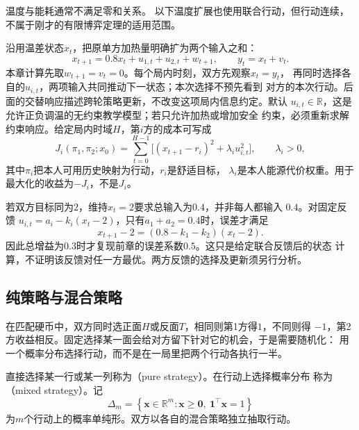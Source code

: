 温度与能耗通常不满足零和关系。
以下温度扩展也使用联合行动，但行动连续，不属于刚才的有限博弈定理的适用范围。

\begin{example}[两方共同加热的状态与成本]
\label{ex:game-two-heaters}
沿用温差状态\(x_t\)，把原单方加热量明确扩为两个输入之和：
\begin{equation}
  x_{t+1}=0.8x_t+u_{1,t}+u_{2,t}+w_{t+1},
  \qquad y_t=x_t+v_t.
  \label{eq:game-two-heater-dynamics}
\end{equation}
本章计算先取\(w_{t+1}=v_t=0\)。每个局内时刻，双方先观察\(x_t=y_t\)，
再同时选择各自的\(u_{i,t}\)，两项输入共同推动下一状态；本次选择不预先看到
对方的本次行动。后面的交替响应描述跨轮策略更新，不改变这项局内信息约定。默认
\(u_{i,t}\in\mathbb R\)，这是允许正负调温的无约束教学模型；若只允许加热或增加安全
约束，必须重新求解约束响应。给定局内时域\(H\)，第\(i\)方的成本可写成
\[
  J_i(\pi_1,\pi_2;x_0)
  =\sum_{t=0}^{H-1}
  \bigl[(x_{t+1}-r_i)^2+\lambda_i u_{i,t}^2\bigr],
  \qquad \lambda_i>0,
\]
其中\(\pi_i\)把本人可用历史映射为行动，\(r_i\)是舒适目标，
\(\lambda_i\)是本人能源代价权重。用于最大化的收益为\(-J_i\)，不是\(J_i\)。
\end{example}

若双方目标同为\(2\)，维持\(x_t=2\)要求总输入为\(0.4\)，并非每人都输入
\(0.4\)。对固定反馈
\(u_{i,t}=a_i-k_i(x_t-2)\)，只有\(a_1+a_2=0.4\)时，误差才满足
\[
  x_{t+1}-2=(0.8-k_1-k_2)(x_t-2).
\]
因此总增益为\(0.3\)时才复现前章的误差系数\(0.5\)。这只是给定联合反馈后的状态
计算，不证明该反馈对任一方最优。两方反馈的选择及更新须另行分析。

\subsection{纯策略与混合策略}
\label{sec:game-pure-mixed}

在匹配硬币中，双方同时选正面\(H\)或反面\(T\)，相同则第1方得\(1\)，不同则得
\(-1\)，第2方收益相反。固定选择某一面会给对方留下针对它的机会，于是需要随机化：
用一个概率分布选择行动，而不是在一局里把两个行动各执行一半。
\begin{definition}[纯策略与混合策略]
\label{def:game-pure-mixed-strategy}
直接选择某一行或某一列称为（pure strategy）。在行动上选择概率分布
称为（mixed strategy）。记
\[
  \Delta_m
  =
  \left\{
    \bm{x}\in\mathbb{R}^m:
    \bm{x}\geq\bm{0},\
    \bm{1}^{\top}\bm{x}=1
  \right\}
\]
为\(m\)个行动上的概率单纯形。双方以各自的混合策略独立抽取行动。
\end{definition}

